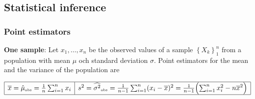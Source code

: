 \documentclass{article}
\newcommand{\Tr}[2]{#1}
\def\obs{{\mbox{\tiny obs}}}
\def\Var{\mbox{Var}}
\begin{document}


\subsection*{\Tr{Statistical inference}{Statistisk inferens}}%

\subsubsection*{\Tr{Point estimators}{Punktskattningar}}

\Tr{%
\textbf{One sample}:
Let $x_1,\dots,x_n$ be the observed values of a sample $\left\{X_k\right\}_1^n$ from a population with
mean $\mu$ och standard deviation $\sigma$. Point estimators
for the mean and the variance of the population are
}{%
\textbf{En stickprov}:
Låt $x_1,\dots,x_n$ vara de observerade värden för ett stickprov
$\left\{X_k\right\}_1^n$ från en population med
väntevärde $\mu$ och standardavvikelse $\sigma.$ Väntevärdesriktiga skattningar
av $\mu$ och $\sigma^2$ är då
}

\[
  \begin{array}[m]{|l|l|}
  \hline
  \overline{x}=\hat\mu_\obs=\frac{1}{n}\sum_{i=1}^n x_i
  &
     s^2
     =\widehat{\sigma^2}_\obs
     =\frac{1}{n-1}\sum_{i=1}^n(x_i-\overline{x})^2
     =\frac{1}{n-1}\Bigl(\sum_{i=1}^nx_i^2-n\overline{x}^2\Bigr)
  \cr\hline
  \end{array}
\]
\end{document}
